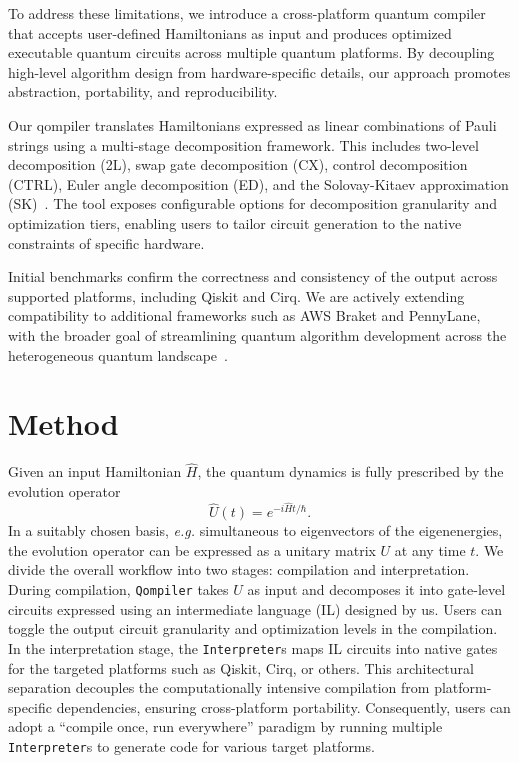 \documentclass[conference]{IEEEtran}
\begin{document}
    To address these limitations, we introduce a cross-platform quantum compiler that accepts user-defined Hamiltonians as input and
    produces optimized executable quantum circuits across multiple quantum platforms.
    By decoupling high-level algorithm design from hardware-specific details, our approach promotes abstraction, portability, and reproducibility.

    Our qompiler translates Hamiltonians expressed as linear combinations of Pauli strings using a multi-stage decomposition framework.
    This includes two-level decomposition (2L), swap gate decomposition (CX), control decomposition (CTRL), Euler angle decomposition (ED),
    and the Solovay-Kitaev approximation (SK)~\cite{nielsen2010quantum}.
    The tool exposes configurable options for decomposition granularity and optimization tiers, enabling users to tailor circuit generation
    to the native constraints of specific hardware.

    Initial benchmarks confirm the correctness and consistency of the output across supported platforms, including Qiskit and Cirq.
    We are actively extending compatibility to additional frameworks such as AWS Braket and PennyLane, with the broader goal of streamlining
    quantum algorithm development across the heterogeneous quantum landscape~\cite{braket-zenodo,pennylane}.


    \section{Method}\label{sec:method}
    Given an input Hamiltonian $\hat{H}$, the quantum dynamics is fully prescribed by the evolution operator
    \begin{equation}
        \hat{U}\left( t \right) = e^{-i\hat{H}t/\hbar}.
    \end{equation}
    In a suitably chosen basis, \emph{e.g.} simultaneous to eigenvectors of the eigenenergies,
    the evolution operator can be expressed as a unitary matrix \( U \) at any time \( t \).
    We divide the overall workflow into two stages: compilation and interpretation.
    During compilation, \texttt{Qompiler} takes \( U \) as input and decomposes it into gate-level circuits expressed using an intermediate language (IL)
    designed by us.
    Users can toggle the output circuit granularity and optimization levels in the compilation.
    In the interpretation stage, the \texttt{Interpreter}s maps IL circuits into native gates for the targeted platforms such as Qiskit, Cirq, or others.
    This architectural separation decouples the computationally intensive compilation from platform-specific dependencies, ensuring cross-platform portability.
    Consequently, users can adopt a ``compile once, run everywhere'' paradigm by running multiple \texttt{Interpreter}s to generate code for various target platforms.
\end{document}
